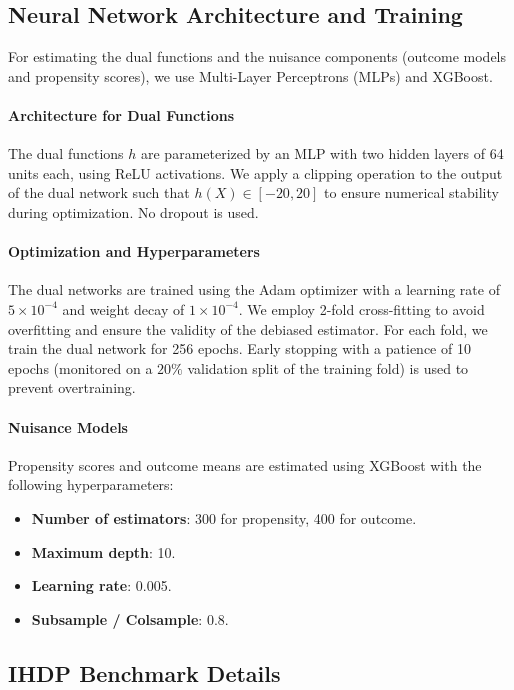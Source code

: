 \subsection{Neural Network Architecture and Training}
\label{app:sim:nn}

For estimating the dual functions and the nuisance components (outcome models and propensity scores), we use Multi-Layer Perceptrons (MLPs) and XGBoost.

\paragraph{Architecture for Dual Functions} 
The dual functions $h$ are parameterized by an MLP with two hidden layers of 64 units each, using ReLU activations. We apply a clipping operation to the output of the dual network such that $h(X) \in [-20, 20]$ to ensure numerical stability during optimization. No dropout is used.

\paragraph{Optimization and Hyperparameters}
The dual networks are trained using the Adam optimizer with a learning rate of $5 \times 10^{-4}$ and weight decay of $1 \times 10^{-4}$. We employ 2-fold cross-fitting to avoid overfitting and ensure the validity of the debiased estimator. For each fold, we train the dual network for 256 epochs. Early stopping with a patience of 10 epochs (monitored on a $20\%$ validation split of the training fold) is used to prevent overtraining.

\paragraph{Nuisance Models}
Propensity scores and outcome means are estimated using XGBoost with the following hyperparameters:
\begin{itemize}
    \item \textbf{Number of estimators}: 300 for propensity, 400 for outcome.
    \item \textbf{Maximum depth}: 10.
    \item \textbf{Learning rate}: 0.005.
    \item \textbf{Subsample / Colsample}: 0.8.
\end{itemize}

\subsection{IHDP Benchmark Details}
\label{app:sim:ihdp}

